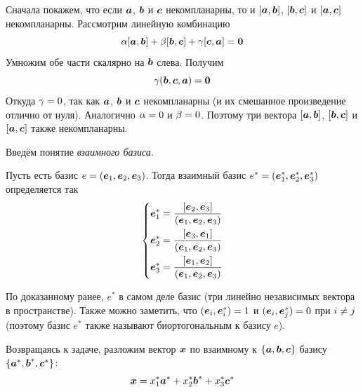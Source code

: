 \documentclass[a4paper,12pt]{article}
\begin{document}
  \begin{solution}
    Сначала покажем, что если $\boldsymbol a$, $\boldsymbol b$ и $\boldsymbol c$ некомпланарны, то и $[\boldsymbol a, \boldsymbol b]$, $[\boldsymbol b, \boldsymbol c]$ и $[\boldsymbol a, \boldsymbol c]$ некомпланарны.
    Рассмотрим линейную комбинацию
    \[
      \alpha [\boldsymbol a, \boldsymbol b] + \beta [\boldsymbol b, \boldsymbol c] + \gamma [\boldsymbol c, \boldsymbol a] = \boldsymbol 0
    \]
    Умножим обе части скалярно на $\boldsymbol b$ слева.
    Получим
    \[
      \gamma (\boldsymbol b, \boldsymbol c, \boldsymbol a) = \boldsymbol 0
    \]
    Откуда $\gamma \hm= 0$, так как $\boldsymbol a$, $\boldsymbol b$ и $\boldsymbol c$ некомпланарны (и их смешанное произведение отлично от нуля).
    Аналогично $\alpha \hm= 0$ и $\beta \hm= 0$.
    Поэтому три вектора $[\boldsymbol a, \boldsymbol b]$, $[\boldsymbol b, \boldsymbol c]$ и $[\boldsymbol a, \boldsymbol c]$ также некомпланарны.
    
    \bigskip
    
    Введём понятие \emph{взаимного базиса}.
    
    \begin{definition}
      Пусть есть базис $e \hm= (\bds e_1, \bds e_2, \bds e_3)$.
      Тогда взаимный базис $e^* \hm= (\bds e_1^*, \bds e_2^*, \bds e_3^*)$ определяется так
      \begin{equation}\label{eq:dual-basis}
        \left\{
          \begin{aligned}
            &\boldsymbol e_1^* = \frac{[\boldsymbol e_2, \boldsymbol e_3]}{(\boldsymbol e_1, \boldsymbol e_2, \boldsymbol e_3)}\\
            &\boldsymbol e_2^* = \frac{[\boldsymbol e_3, \boldsymbol e_1]}{(\boldsymbol e_1, \boldsymbol e_2, \boldsymbol e_3)}\\
            &\boldsymbol e_3^* = \frac{[\boldsymbol e_1, \boldsymbol e_2]}{(\boldsymbol e_1, \boldsymbol e_2, \boldsymbol e_3)}
          \end{aligned}
        \right.
      \end{equation}
    \end{definition}
    
    По доказанному ранее, $e^*$ в самом деле базис (три линейно независимых вектора в пространстве).
    Также можно заметить, что $(\bds e_i, \bds e_i^*) \hm= 1$ и $(\bds e_i, \bds e_j^*) \hm= 0$ при $i \hm{\not=} j$ (поэтому базис $e^*$ также называют биортогональным к базису $e$). %
    
    \bigskip
    
    Возвращаясь к задаче, разложим вектор $\boldsymbol x$ по взаимному к $\{\boldsymbol a, \boldsymbol b, \boldsymbol c\}$ базису $\{\boldsymbol a^*, \boldsymbol b^*, \boldsymbol c^*\}$:
    \[
      \boldsymbol x = x_1^* \boldsymbol a^* + x_2^* \boldsymbol b^* + x_3^* \boldsymbol c^*
    \]
    

\end{solution}
\end{document}
